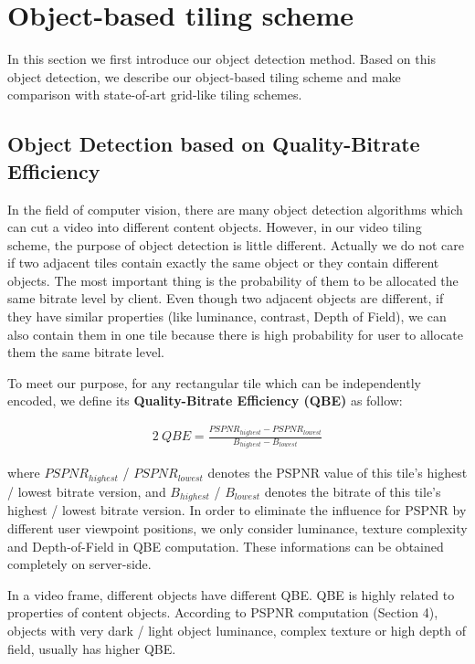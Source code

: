 \section{Object-based tiling scheme}

In this section we first introduce our object detection method. Based on this object detection, we describe our object-based tiling scheme and make comparison with state-of-art grid-like tiling schemes.

\subsection{Object Detection based on Quality-Bitrate Efficiency}

In the field of computer vision, there are many object detection algorithms which can cut a video into different content objects. However, in our video tiling scheme, the purpose of object  detection is little different. Actually we do not care if two adjacent tiles contain exactly the same object or they contain different objects. The most important thing is the probability of them to be allocated the same bitrate level by client. Even though two adjacent objects are different, if they have similar properties (like luminance, contrast, Depth of Field), we can also contain them in one tile because there is high probability for user to allocate them the same bitrate level.

To meet our purpose, for any rectangular tile which can be independently encoded, we define its \textbf{Quality-Bitrate Efficiency (QBE)} as follow:

\begin{alignat}{2}\
QBE = \frac{PSPNR_{highest} - PSPNR_{lowest}}{B_{highest} - B_{lowest}} \label{QBE}
\end{alignat}

where $PSPNR_{highest}$ / $PSPNR_{lowest}$ denotes the PSPNR value of this tile's highest / lowest bitrate version, and $B_{highest}$ / $B_{lowest}$ denotes the bitrate of this tile's highest / lowest bitrate version. In order to eliminate the influence for PSPNR by different user viewpoint positions, we only consider luminance, texture complexity and Depth-of-Field in QBE computation. These informations can be obtained completely on server-side.

In a video frame, different objects have different QBE. QBE is highly related to properties of content objects. According to PSPNR computation (Section 4), objects with very dark / light object luminance, complex texture or high depth of field, usually has higher QBE.


